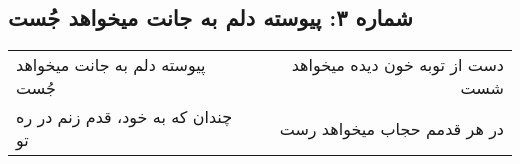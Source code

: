 \begin{center}
\section*{شماره ۳: پیوسته دلم به جانت میخواهد جُست}
\label{sec:003}
\begin{longtable}{l p{0.5cm} r}
پیوسته دلم به جانت میخواهد جُست
&&
دست از توبه خون دیده میخواهد شست
\\
چندان که به خود، قدم زنم در ره تو
&&
در هر قدمم حجاب میخواهد رست
\\
\end{longtable}
\end{center}
